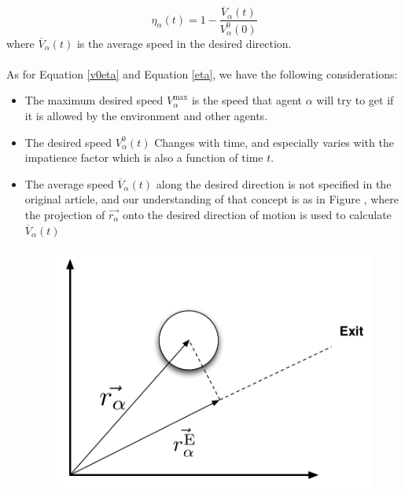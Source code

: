 \begin{equation}\label{eta}
	\eta_{\alpha} \left( t \right) =
    1 - \frac{\overline{V}_{\alpha} \left( t \right)}
             {V_{\alpha}^{0} \left( 0 \right)}
\end{equation}
where $\overline{V}_{\alpha}\left( t \right)$ is the average speed in the desired direction.\\\\
As for Equation \ref{v0eta} and Equation \ref{eta}, we have the following considerations:
\begin{itemize}
\item The maximum desired speed $V_{\alpha}^{\text{max}}$ is the speed that agent $\alpha$ will try to get if it is allowed by the 
environment and other agents. 
\item The desired speed $V_{\alpha}^{0} \left( t \right)$ Changes with time, and especially varies with the impatience factor which is also a function of time $ t $.
\item The average speed $\overline{V}_{\alpha} \left( t \right)$ along the desired direction is not specified in the original article, and our understanding of that concept is as in Figure , where the projection of $ \vec{r_{\alpha}} $ onto the desired direction of motion is used to calculate $\overline{V}_{\alpha} \left( t \right)$

\begin{figure}[ht]
\centering
{\includegraphics[scale=0.35]{Figures/NotationOfAgent2.pdf}} 
\caption{}
\label{impatience}
\end{figure}


\end{itemize}
